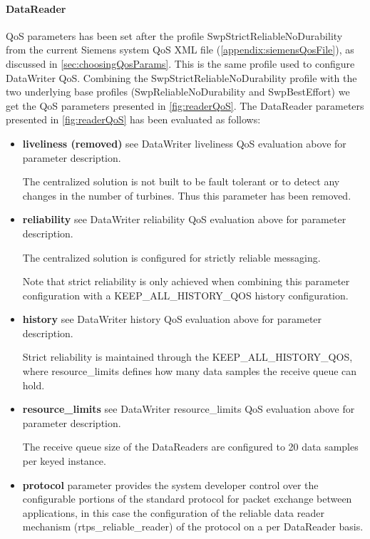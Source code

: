 \FloatBarrier

\paragraph{DataReader} QoS parameters has been set after the profile SwpStrictReliableNoDurability from the current Siemens system QoS XML file (\cref{appendix:siemensQosFile}), as discussed in \cref{sec:choosingQosParams}. This is the same profile used to configure DataWriter QoS. Combining the SwpStrictReliableNoDurability profile with the two underlying base profiles (SwpReliableNoDurability and SwpBestEffort) we get the QoS parameters presented in \cref{fig:readerQoS}. The DataReader parameters presented in \cref{fig:readerQoS} has been evaluated as follows:

\begin{itemize}
	\item \textbf{liveliness (removed)} see DataWriter liveliness QoS evaluation above for parameter description. 
	
	The centralized solution is not built to be fault tolerant or to detect any changes in the number of turbines. Thus this parameter has been removed.
	
	\item \textbf{reliability} see DataWriter reliability QoS evaluation above for parameter description.
	
	The centralized solution is configured for strictly reliable messaging.
	
	Note that strict reliability is only achieved when combining this parameter configuration with a KEEP\_ALL\_HISTORY\_QOS history configuration.
	\item \textbf{history} see DataWriter history QoS evaluation above for parameter description.
	
	Strict reliability is maintained through the KEEP\_ALL\_HISTORY\_QOS, where resource\_limits defines how many data samples the receive queue can hold.
	
	\item \textbf{resource\_limits} see DataWriter resource\_limits QoS evaluation above for parameter description.
	
	The receive queue size of the DataReaders are configured to 20 data samples per keyed instance. 
	\item \textbf{protocol} parameter provides the system developer control over the configurable portions of the standard protocol for packet exchange between applications, in this case the configuration of the reliable data reader mechanism (rtps\_reliable\_reader) of the protocol on a per DataReader basis.
	

\end{itemize}
